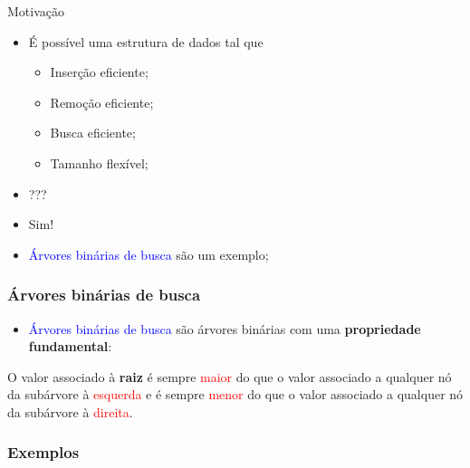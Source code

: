 \documentclass{beamer}
\newcommand{\tcb}[1]{\textcolor{blue}{#1}}
\newcommand{\tcr}[1]{\textcolor{red}{#1}}
\begin{document}
\begin{frame}[c]{Motivação}
  \begin{itemize}
    \item É possível uma estrutura de dados tal que
      \begin{itemize}
        \item Inserção eficiente;
        \item Remoção eficiente;
        \item Busca eficiente;
        \item Tamanho flexível;
      \end{itemize}
    \item ???
    \pause
    \item Sim!
    \pause
  \item \tcb{Árvores binárias de busca} são um exemplo;
  \end{itemize}
\end{frame}

\begin{frame}[c]
  \frametitle{Árvores binárias de busca}

  \begin{itemize}
    \item \tcb{Árvores binárias de busca} são árvores binárias com uma \textbf{propriedade fundamental}:
  \end{itemize}

  \center O valor associado à \textbf{raiz} é sempre \tcr{maior} do que o valor
          associado a qualquer nó da subárvore à \tcr{esquerda} e é sempre \tcr{menor} do que
          o valor associado a qualquer nó da subárvore à \tcr{direita}.
  
\end{frame}

\begin{frame}
  \frametitle{Exemplos}
      \centering
\end{frame}
\end{document}
